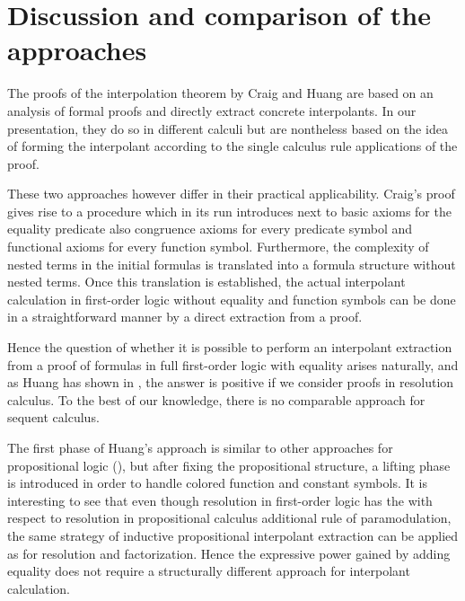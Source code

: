 \section{Discussion and comparison of the approaches}

The proofs of the interpolation theorem by Craig and Huang are based on an analysis of formal proofs and directly extract concrete interpolants.
In our presentation, they do so in different calculi but are nontheless based on the idea of forming the interpolant according to the single calculus rule applications of the proof.

These two approaches however differ in their practical applicability. 
Craig's proof gives rise to a procedure which in its run introduces next to basic axioms for the equality predicate also congruence axioms for every predicate symbol and functional axioms for every function symbol.
Furthermore, the complexity of nested terms in the initial formulas is translated into a formula structure without nested terms.
Once this translation is established, the actual interpolant calculation in first-order logic without equality and function symbols can be done in a straightforward manner by a direct extraction from a proof.

Hence the question of whether it is possible to perform an interpolant extraction from a proof of formulas in full first-order logic with equality arises naturally, and as Huang has shown in \cite{Huang95}, the answer is positive if we consider proofs in resolution calculus.
To the best of our knowledge, there is no comparable approach for sequent calculus.

The first phase of Huang's approach is similar to other approaches for propositional logic (\cite{krajivcek1997interpolation,Pudlak97,McMillan03}),
but after fixing the propositional structure, a lifting phase is introduced in order to handle colored function and constant symbols.
It is interesting to see that even though resolution in first-order logic has the with respect to resolution in propositional calculus additional rule of paramodulation, the same strategy of inductive propositional interpolant extraction can be applied as for resolution and factorization.
Hence the expressive power gained by adding equality does not require a structurally different approach for interpolant calculation.



